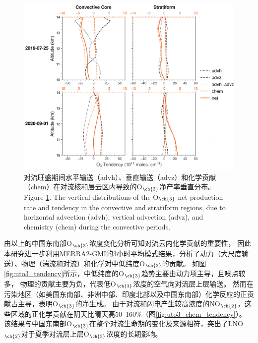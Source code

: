 \begin{figure}[H]
\centering
\includegraphics[width=\textwidth]{./figures/tendency_o3_classification.png}
\caption{
对流旺盛期间水平输送（advh）、垂直输送（advz）和化学贡献（chem）在对流核和层云区内导致的O$_{\ch{3}}$净产率垂直分布。
\\
Figure \ref{fig:tendency_o3_classification}. The vertical distributions of the O$_{\ch{3}}$ net production rate and tendency in the convective and stratiform regions, due to horizontal advection (advh), vertical advection (advz), and chemistry (chem) during the convective periods.
}
\label{fig:tendency_o3_classification}
\end{figure}

由以上的中国东南部O$_{\ch{3}}$浓度变化分析可知对流云内化学贡献的重要性，
因此本研究进一步利用MERRA2-GMI的3小时平均模式结果，分析了动力（大尺度输送）、物理（湍流和对流）和化学对中低纬度O$_{\ch{3}}$的贡献。
如图\ref{fig:uto3_tendency}所示，中低纬度的O$_{\ch{3}}$趋势主要由动力项主导，且噪点较多，
物理的贡献主要为负，代表低O$_{\ch{3}}$浓度的空气向对流层上层输送。
然而在污染地区（如美国东南部、非洲中部、印度北部以及中国东南部）化学反应的正贡献占主导，表明O$_{\ch{3}}$的净生成。
由于对流和闪电产生较高浓度的NO$_{\ch{2}}$，这些区域的正化学贡献在阴天比晴天高50--160\%（图\ref{fig:uto3_chem_tendency}）。
该结果与中国东南部O$_{\ch{3}}$在整个对流生命期的变化及来源相符，突出了LNO$_{\ch{2}}$对于夏季对流层上层O$_{\ch{3}}$浓度的长期影响。

